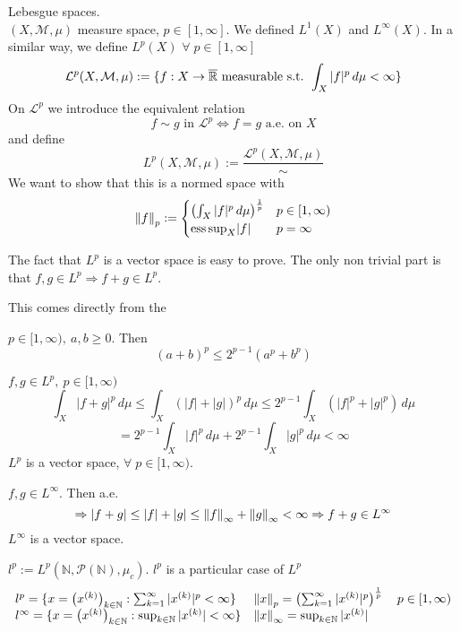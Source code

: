 Lebesgue spaces. \\
\((X, \mathcal{M}, \mu)\) measure space, \(p \in \left[1, \infty\right]\). We defined \(L^1(X)\) and \(L^\infty(X)\). 
In a similar way, we define \(L^p(X)\) \(\forall \; p \in \left[1, \infty\right]\)
\[
    \mathcal{L}^p (X, \mathcal{M}, \mu) := \{ f: X \rightarrow \overline{\mathbb{R}} \text{ measurable s.t. } \int_X |f|^p \, d\mu < \infty\}
\]
On \(\mathcal{L}^p\) we introduce the equivalent relation
\[
    f \sim g \text{ in } \mathcal{L}^p \iff f=g \text{ a.e. on } X 
\]
and define 
\[
    {L}^p (X, \mathcal{M}, \mu) := \frac{\mathcal{L}^p (X, \mathcal{M}, \mu)}{\sim}
\]
We want to show that this is a normed space with
\[
    \norm{f}_p := 
    \begin{cases}
        \left( \int_X |f|^p \, d\mu \right)^{\frac{1}{p}}  & p \in [1, \infty) \\
        \text{ess}\, \text{sup}_X |f| & p = \infty
    \end{cases}
\]

The fact that \(L^p\) is a vector space is easy to prove. The only non trivial part is that \(f, g \in L^p \Rightarrow f+g \in L^p\).

This comes directly from the 
\begin{lemma}
    \(p \in [1, \infty), \ a, b \geq 0\). Then 
    \[
        \left(a+b\right)^p \leq 2^{p-1} \left(a^p+b^p\right) 
    \]
\end{lemma}

\(f, g \in L^p, \ p \in [1, \infty)\)
\[
    \int_X |f+g|^p \, d\mu \leq \int_X (|f|+|g|)^p \, d\mu 
    \leq 2^{p-1} \int_X (|f|^p+|g|^p) \, d\mu
\]
\[
    = 2^{p-1} \int_X |f|^p \, d\mu + 2^{p-1} \int_X |g|^p \, d\mu < \infty
\]
\(L^p\) is a vector space, \(\forall \; p \in [1, \infty)\).


\(f, g \in L^\infty\). Then a.e. 
\[
    \Rightarrow |f+g| \leq |f|+|g| \leq \norm{f}_\infty + \norm{g}_\infty < \infty
    \Rightarrow f+g \in L^\infty
\]
\(L^\infty\) is a vector space. 

\begin{remark}
    \(l^p := L^p (\mathbb{N}, \mathcal{P}(\mathbb{N}), \mu_c )\). \(l^p\) is a particular case of \(L^p\)
    \[
    \begin{array}{ll}
        l^p = \{ x = \left(x^{(k)}\right)_{k \in \mathbb{N}} : \sum_{k=1}^\infty |x^{(k)}|^p < \infty \} 
        & \norm{x}_p = \left( \sum_{k=1}^\infty |x^{(k)}|^p \right)^{\frac{1}{p}} \quad p \in [1, \infty)
        \\ l^\infty = \{ x = \left(x^{(k)}\right)_{k \in \mathbb{N}} : \sup_{k \in \mathbb{N}} |x^{(k)}| < \infty \} 
        & \norm{x}_\infty = \sup_{k \in \mathbb{N}} |x^{(k)}|
    \end{array}
    \]
\end{remark}

